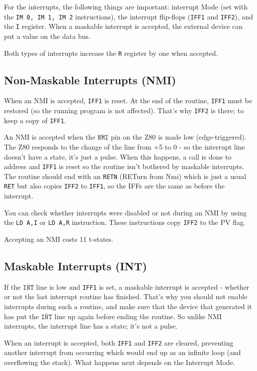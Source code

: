 For the interrupts, the following things are important: interrupt Mode (set with the {\tt IM 0, IM 1, IM 2} instructions), the interrupt flip-flops ({\tt IFF1} and {\tt IFF2}), and the {\tt I} register. When a maskable interrupt is accepted, the external device can put a value on the data bus.

Both types of interrupts increase the {\tt R} register by one when accepted.


\subsection{Non-Maskable Interrupts (NMI)}

When an NMI is accepted, {\tt IFF1} is reset. At the end of the routine, {\tt IFF1} must be restored (so the running program is not affected). That's why {\tt IFF2} is there; to keep a copy of {\tt IFF1}.

An NMI is accepted when the $\mathtt{\overline{NMI}}$ pin on the Z80 is made low (edge-triggered). The Z80 responds to the change of the line from +5 to 0 - so the interrupt line doesn't have a state, it's just a pulse. When this happens, a call is done to address  and {\tt IFF1} is reset so the routine isn't bothered by maskable interrupts. The routine should end with an {\tt RETN} (RETurn from Nmi) which is just a usual {\tt RET} but also copies {\tt IFF2} to {\tt IFF1}, so the IFFs are the same as before the interrupt.

You can check whether interrupts were disabled or not during an NMI by using the {\tt LD A,I} or {\tt LD A,R} instruction. These instructions copy {\tt IFF2} to the PV flag.

Accepting an NMI costs 11 t-states.


\subsection{Maskable Interrupts (INT)}

If the $\mathtt{\overline{INT}}$ line is low and {\tt IFF1} is set, a maskable interrupt is accepted - whether or not the last interrupt routine has finished. That's why you should not enable interrupts during such a routine, and make sure that the device that generated it has put the $\mathtt{\overline{INT}}$ line up again before ending the routine. So unlike NMI interrupts, the interrupt line has a state; it's not a pulse.

When an interrupt is accepted, both {\tt IFF1} and {\tt IFF2} are cleared, preventing another interrupt from occurring which would end up as an infinite loop (and overflowing the stack). What happens next depends on the Interrupt Mode.

